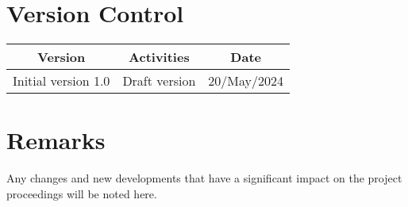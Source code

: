 
\section*{Version Control}

\begin{tabular}{|c|c|c|}
  \hline
  \textbf{Version}    & \textbf{Activities} & \textbf{Date} \\
  \hline
  Initial version 1.0 & Draft version       & 20/May/2024    \\
  \hline
\end{tabular}

\section*{Remarks}

\noindent Any changes and new developments that have a significant impact on the project proceedings will be noted here.
